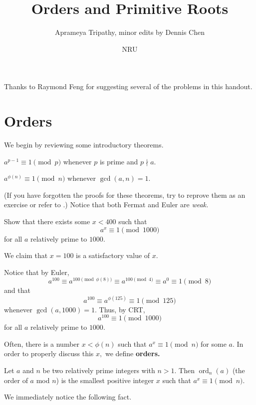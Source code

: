 \documentclass{article}
\title{Orders and Primitive Roots}
\author{Aprameya Tripathy, minor edits by Dennis Chen}
\date{NRU}
\begin{document}
\maketitle

Thanks to Raymond Feng for suggesting several of the problems in this handout.

\section{Orders}
We begin by reviewing some introductory theorems.

\begin{theo}[Fermat]
$a^{p-1} \equiv 1 \pmod{p}$ whenever $p$ is prime and $p \nmid a.$
\end{theo}

\begin{theo}[Euler]
$a^{\phi(n)} \equiv 1 \pmod{n}$ whenever $\gcd(a, n) = 1.$
\end{theo}

(If you have forgotten the proofs for these theorems, try to reprove them as an exercise or refer to .) Notice that both Fermat and Euler are \emph{weak.}

\begin{exam}
Show that there exists some $x < 400$ such that $$a^x \equiv 1 \pmod{1000}$$ for all $a$ relatively prime to $1000.$
\end{exam}

\begin{sol}
We claim that $x=100$ is a satisfactory value of $x.$

Notice that by Euler, $$a^{100} \equiv a^{100 \pmod{\phi(8)}} \equiv a^{100 \pmod{4}} \equiv a^0 \equiv 1 \pmod{8}$$ and that $$a^{100} \equiv a^{\phi (125)} \equiv 1 \pmod{125}$$ whenever $\gcd(a, 1000) = 1.$ Thus, by CRT, $$a^{100} \equiv 1 \pmod{1000}$$ for all $a$ relatively prime to $1000.$
\end{sol}

Often, there is a number $x < \phi(n)$ such that $a^x \equiv 1 \pmod{n}$ for some $a.$ In order to properly discuss this $x,$ we define \textbf{orders.}

\begin{defi}[Orders]
Let $a$ and $n$ be two relatively prime integers with $n>1.$ Then $\operatorname{ord}_n(a)$ (the order of $a$ mod $n$) is the smallest positive integer $x$ such that $a^x \equiv 1 \pmod{n}.$
\end{defi}

We immediately notice the following fact.
\end{document}
